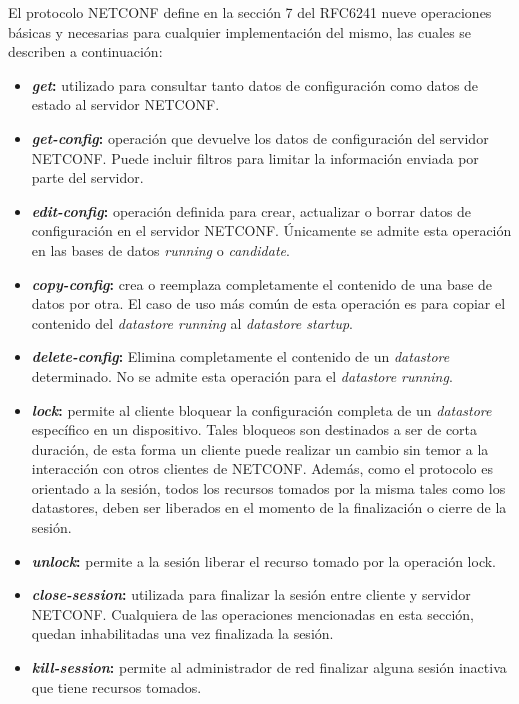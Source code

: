 El protocolo NETCONF define en la sección 7 del RFC6241 nueve operaciones básicas y necesarias para cualquier implementación del mismo, las cuales se describen a continuación:
\begin{itemize}
	\item \textbf{\textit{get}:} utilizado para consultar tanto datos de configuración como datos de estado al servidor NETCONF.
	\item \textbf{\textit{get-config}:} operación que devuelve los datos de configuración del servidor NETCONF. Puede incluir filtros para limitar la información enviada por parte del servidor.
	\item \textbf{\textit{edit-config}:} operación definida para crear, actualizar o borrar datos de configuración en el servidor NETCONF. Únicamente se admite esta operación en las bases de datos \textit{running} o \textit{candidate}.
	\item \textbf{\textit{copy-config}:} crea o reemplaza completamente el contenido de una base de datos por otra. El caso de uso más común de esta operación es para copiar el contenido del \textit{datastore running} al \textit{datastore startup}. 
	\item \textbf{\textit{delete-config}:} Elimina completamente el contenido de un \textit{datastore} determinado. No se admite esta operación para el \textit{datastore running}.
	\item \textbf{\textit{lock}:} permite al cliente bloquear la configuración completa de un \textit{datastore} específico en un dispositivo. Tales bloqueos son destinados a ser de corta duración, de esta forma un cliente puede realizar un cambio sin temor a la interacción con otros clientes de NETCONF. Además, como el protocolo es orientado a la sesión, todos los recursos tomados por la misma tales como los datastores, deben ser liberados en el momento de la finalización o cierre de la sesión.
	\item \textbf{\textit{unlock}:} permite a la sesión liberar el recurso tomado por la operación lock.
	\item \textbf{\textit{close-session}:} utilizada para finalizar la sesión entre cliente y servidor NETCONF. Cualquiera de las operaciones mencionadas en esta sección, quedan inhabilitadas una vez finalizada la sesión.
	\item \textbf{\textit{kill-session}:} permite al administrador de red finalizar alguna sesión inactiva que tiene recursos tomados. 
\end{itemize}

